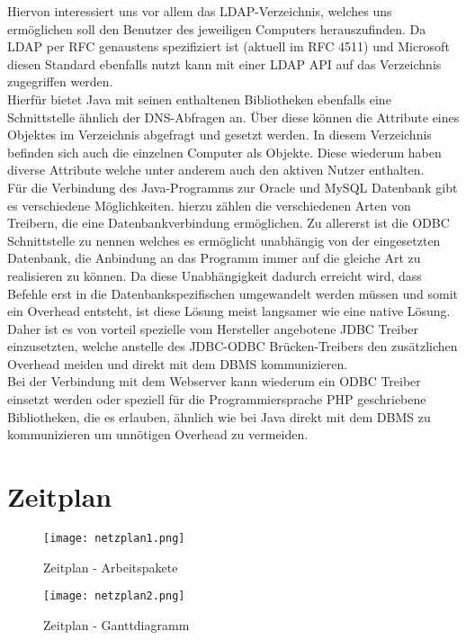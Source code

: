 Hiervon interessiert uns vor allem das LDAP-Verzeichnis, welches uns ermöglichen soll den Benutzer des jeweiligen Computers herauszufinden.
Da LDAP per RFC genaustens spezifiziert ist (aktuell im RFC 4511) und Microsoft diesen Standard ebenfalls nutzt kann mit einer LDAP API auf das Verzeichnis zugegriffen werden.\\
Hierfür bietet Java mit seinen enthaltenen Bibliotheken ebenfalls eine Schnittstelle ähnlich der DNS-Abfragen an. Über diese können die Attribute eines Objektes im Verzeichnis abgefragt und gesetzt werden. In diesem Verzeichnis befinden sich auch die einzelnen Computer als Objekte. Diese wiederum haben diverse Attribute welche unter anderem auch den aktiven Nutzer enthalten.\\
Für die Verbindung des Java-Programms zur Oracle und MySQL Datenbank gibt es verschiedene Möglichkeiten. hierzu zählen die verschiedenen Arten von Treibern, die eine Datenbankverbindung ermöglichen. Zu allererst ist die ODBC Schnittstelle zu nennen welches es ermöglicht unabhängig von der eingesetzten Datenbank, die Anbindung an das Programm immer auf die gleiche Art zu realisieren zu können. Da diese Unabhängigkeit dadurch erreicht wird, dass Befehle erst in die Datenbankspezifischen umgewandelt werden müssen und somit ein Overhead entsteht, ist diese Lösung meist langsamer wie eine native Lösung. Daher ist es von vorteil spezielle vom Hersteller angebotene JDBC Treiber einzusetzten, welche anstelle des JDBC-ODBC Brücken-Treibers den zusätzlichen Overhead meiden und direkt mit dem DBMS kommunizieren.\\
Bei der Verbindung mit dem Webserver kann wiederum ein ODBC Treiber einsetzt werden oder speziell für die Programmiersprache PHP geschriebene Bibliotheken, die es erlauben, ähnlich wie bei Java direkt mit dem DBMS zu kommunizieren um unnötigen Overhead zu vermeiden.\\

\section{Zeitplan}
\label{sec:timetable}

\begin{figure}[H]
\centering
\texttt{[image: netzplan1.png]}
\caption{Zeitplan - Arbeitspakete}
\label{fig:benchsnmpbulk}
\end{figure}

\begin{figure}[H]
\centering
\texttt{[image: netzplan2.png]}
\caption{Zeitplan - Ganttdiagramm}
\label{fig:benchsnmpbulk}
\end{figure}

